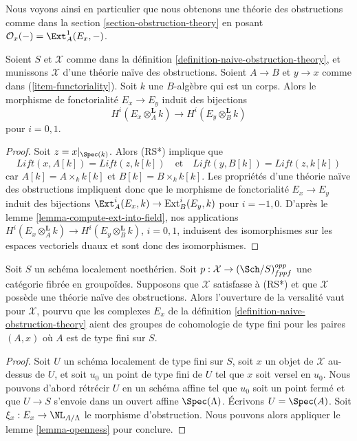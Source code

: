 \noindent
Nous voyons ainsi en particulier que nous obtenons une théorie des
obstructions comme dans la section \ref{section-obstruction-theory} en posant
$\mathcal{O}_x( - ) = \Ext^1_A(E_x, -)$.

\begin{lemma}
\label{lemma-naive-obstruction-theory-qis}
Soient $S$ et $\mathcal{X}$ comme dans la définition
\ref{definition-naive-obstruction-theory}, et munissons $\mathcal{X}$ d'une
théorie naïve des obstructions. Soient $A \to B$ et $y \to x$ comme dans
(\ref{item-functoriality}). Soit $k$ une $B$-algèbre qui est un corps. Alors
le morphisme de fonctorialité $E_x \to E_y$ induit des bijections
$$
H^i(E_x \otimes_A^{\mathbf{L}} k) \to H^i(E_y \otimes_B^{\mathbf{L}} k)
$$
pour $i = 0, 1$.
\end{lemma}

\begin{proof}
Soit $z = x|_{\Spec(k)}$. Alors (RS*) implique que
$$
\textit{Lift}(x, A[k]) = \textit{Lift}(z, k[k])
\quad\text{et}\quad
\textit{Lift}(y, B[k]) = \textit{Lift}(z, k[k])
$$
car $A[k] = A \times_k k[k]$ et $B[k] = B \times_k k[k]$. Les propriétés
d'une théorie naïve des obstructions impliquent donc que le morphisme de
fonctorialité $E_x \to E_y$ induit des bijections
$\Ext^i_A(E_x, k) \to \text{Ext}^i_B(E_y, k)$ pour $i = -1, 0$. D'après le
lemme \ref{lemma-compute-ext-into-field}, nos applications
$H^i(E_x \otimes_A^{\mathbf{L}} k) \to H^i(E_y \otimes_B^{\mathbf{L}} k)$,
$i = 0, 1$, induisent des isomorphismes sur les espaces vectoriels duaux et
sont donc des isomorphismes.
\end{proof}

\begin{lemma}
\label{lemma-naive-obstruction-theory-gives-openness}
Soit $S$ un schéma localement noethérien. Soit
$p : \mathcal{X} \to (\Sch/S)_{fppf}^{opp}$ une catégorie fibrée en
groupoïdes. Supposons que $\mathcal{X}$ satisfasse à (RS*) et que
$\mathcal{X}$ possède une théorie naïve des obstructions. Alors l'ouverture
de la versalité vaut pour $\mathcal{X}$, pourvu que les complexes $E_x$ de la
définition \ref{definition-naive-obstruction-theory} aient des groupes de
cohomologie de type fini pour les paires $(A, x)$ où $A$ est de type fini sur
$S$.
\end{lemma}

\begin{proof}
Soit $U$ un schéma localement de type fini sur $S$, soit $x$ un objet de
$\mathcal{X}$ au-dessus de $U$, et soit $u_0$ un point de type fini de $U$ tel
que $x$ soit versel en $u_0$. Nous pouvons d'abord rétrécir $U$ en un schéma
affine tel que $u_0$ soit un point fermé et que $U \to S$ s'envoie dans un
ouvert affine $\Spec(\Lambda)$. Écrivons $U = \Spec(A)$. Soit
$\xi_x : E_x \to \NL_{A/\Lambda}$ le morphisme d'obstruction. Nous pouvons
alors appliquer le lemme \ref{lemma-openness} pour conclure.
\end{proof}









